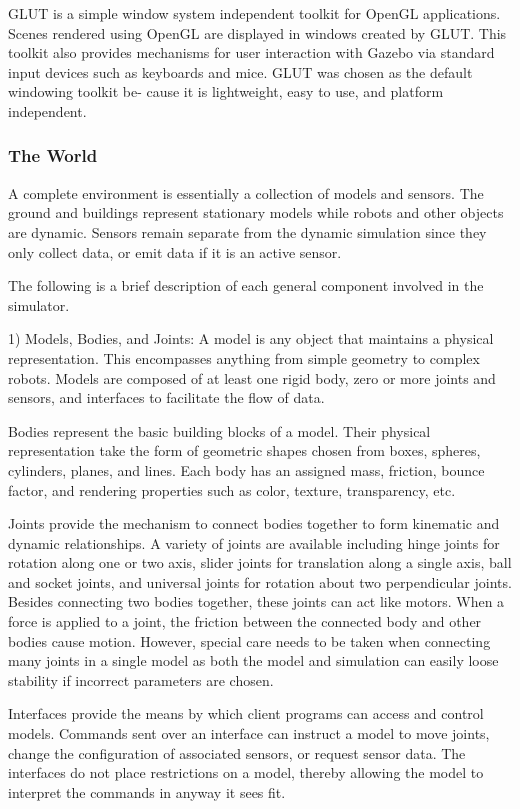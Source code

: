 GLUT is a simple window system independent toolkit for OpenGL applications. Scenes rendered using OpenGL are displayed in windows created by GLUT. This toolkit also provides mechanisms for user interaction with Gazebo via standard input devices such as keyboards and mice. GLUT was chosen as the default windowing toolkit be- cause it is lightweight, easy to use, and platform independent.

\subsubsection{The World}

A complete environment is essentially a collection of models and sensors. The ground and buildings represent stationary models while robots and other objects are dynamic. Sensors remain separate from the dynamic simulation since they only collect data, or emit data if it is an active sensor.

The following is a brief description of each general component involved in the simulator.

1) Models, Bodies, and Joints: A model is any object that maintains a physical representation. This encompasses anything from simple geometry to complex robots. Models are composed of at least one rigid body, zero or more joints and sensors, and interfaces to facilitate the flow of data.

Bodies represent the basic building blocks of a model. Their physical representation take the form of geometric shapes chosen from boxes, spheres, cylinders, planes, and lines. Each body has an assigned mass, friction, bounce factor, and rendering properties such as color, texture, transparency, etc.

Joints provide the mechanism to connect bodies together to form kinematic and dynamic relationships. A variety of joints are available including hinge joints for rotation along one or two axis, slider joints for translation along a single axis, ball and socket joints, and universal joints for rotation about two perpendicular joints. Besides connecting two bodies together, these joints can act like motors. When a force is applied to a joint, the friction between the connected body and other bodies cause motion. However, special care needs to be taken when connecting many joints in a single model as both the model and simulation can easily loose stability if incorrect parameters are chosen.

Interfaces provide the means by which client programs can access and control models. Commands sent over an interface can instruct a model to move joints, change the configuration of associated sensors, or request sensor data. The interfaces do not place restrictions on a model, thereby allowing the model to interpret the commands in anyway it sees fit.

